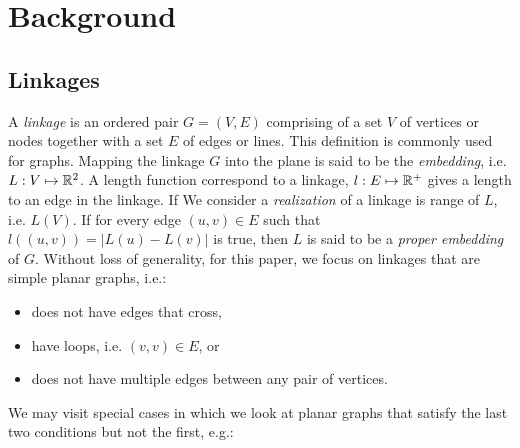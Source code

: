 \section{Background}
\subsection{Linkages}
A \textit{linkage} is an ordered pair $G = (V,E)$ comprising of a set $V$ of vertices or nodes 
together with a set $E$ of edges or lines. This definition is commonly used for graphs.  Mapping 
the linkage $G$ into the plane is said to be the \textit{embedding}, i.e. $L : V \mapsto 
{\mathbb{R}}^{2}$.  A length function correspond to a linkage, $l: E \mapsto {\mathbb{R}}^+$ gives a length to an 
edge in the linkage.  If We consider a \textit{realization} of a linkage is range of $L$, i.e. 
$L(V)$. If for every edge $(u,v) \in E$ such that $l\left( \left(u,v\right) \right) = \left\vert 
L(u) - L(v) \right\vert$ is true, then $L$ is said to be a \textit{proper embedding} of $G$.
Without loss of generality, for this paper, we focus on linkages that are simple planar  graphs, 
i.e.:
\begin{itemize}
\item[\rn{1}] does not have edges that cross,
\item[\rn{2}] have loops, i.e. $(v,v) \in E$, or
\item[\rn{3}] does not have multiple edges between any pair of vertices.
\end{itemize}
We may visit special cases in which we look at planar graphs that satisfy the last two conditions 
but not the first, e.g.:

